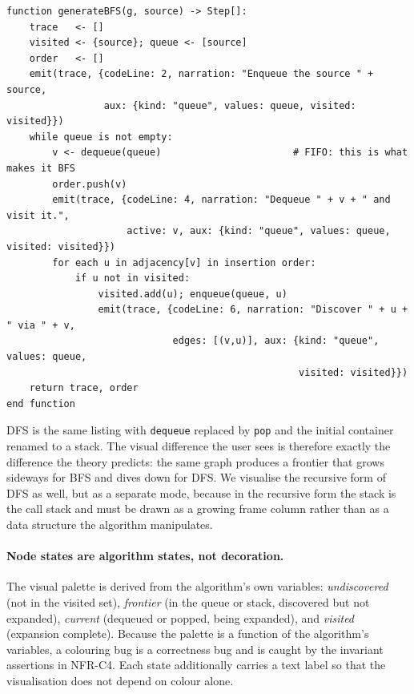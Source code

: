 \documentclass[11pt,a4paper]{article}
\newcommand{\ct}[1]{\texttt{#1}}
\begin{document}
\begin{lstlisting}[style=pseudo,caption={Breadth-first search with instrumentation. The
\ct{aux} payload is the live queue and visited set, which is exactly what the middle and
right-hand panels of the workspace render.},label={lst:bfs}]
function generateBFS(g, source) -> Step[]:
    trace   <- []
    visited <- {source}; queue <- [source]
    order   <- []
    emit(trace, {codeLine: 2, narration: "Enqueue the source " + source,
                 aux: {kind: "queue", values: queue, visited: visited}})
    while queue is not empty:
        v <- dequeue(queue)                       # FIFO: this is what makes it BFS
        order.push(v)
        emit(trace, {codeLine: 4, narration: "Dequeue " + v + " and visit it.",
                     active: v, aux: {kind: "queue", values: queue, visited: visited}})
        for each u in adjacency[v] in insertion order:
            if u not in visited:
                visited.add(u); enqueue(queue, u)
                emit(trace, {codeLine: 6, narration: "Discover " + u + " via " + v,
                             edges: [(v,u)], aux: {kind: "queue", values: queue,
                                                   visited: visited}})
    return trace, order
end function
\end{lstlisting}

DFS is the same listing with \ct{dequeue} replaced by \ct{pop} and the initial container
renamed to a stack. The visual difference the user sees is therefore exactly the difference
the theory predicts: the same graph produces a frontier that grows sideways for BFS and
dives down for DFS. We visualise the recursive form of DFS as well, but as a separate mode,
because in the recursive form the stack is the call stack and must be drawn as a growing
frame column rather than as a data structure the algorithm manipulates.

\paragraph{Node states are algorithm states, not decoration.} The visual palette is
derived from the algorithm's own variables: \emph{undiscovered} (not in the visited set),
\emph{frontier} (in the queue or stack, discovered but not expanded), \emph{current}
(dequeued or popped, being expanded), and \emph{visited} (expansion complete). Because the
palette is a function of the algorithm's variables, a colouring bug is a correctness bug and
is caught by the invariant assertions in NFR-C4. Each state additionally carries a text
label so that the visualisation does not depend on colour alone.
\end{document}
